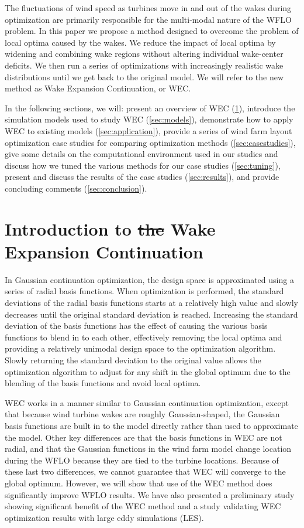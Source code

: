 \documentclass[hidelinks,sort&compress,AMA,STIX1COL]{WileyNJD-v2}
\providecommand{\DIFdel}[1]{{\protect\color{red}\sout{#1}}}                      %
\providecommand{\DIFdelbegin}{} %
\providecommand{\DIFdelend}{} %
\newcommand{\DIFscaledelfig}{0.5}
\newlength{\DIFdelgraphicswidth} %
\newlength{\DIFdelgraphicsheight} %
\newcommand{\DIFdelincludegraphics}[2][]{%
\sbox{\DIFdelgraphicsbox}{\DIFOincludegraphics[#1]{#2}}%
\settoboxwidth{\DIFdelgraphicswidth}{\DIFdelgraphicsbox} %
\settoboxtotalheight{\DIFdelgraphicsheight}{\DIFdelgraphicsbox} %
\scalebox{\DIFscaledelfig}{%
\parbox[b]{\DIFdelgraphicswidth}{\usebox{\DIFdelgraphicsbox}\\[-\baselineskip] \rule{\DIFdelgraphicswidth}{0em}}\llap{\resizebox{\DIFdelgraphicswidth}{\DIFdelgraphicsheight}{%
\setlength{\unitlength}{\DIFdelgraphicswidth}%
\begin{picture}(1,1)%
\thicklines\linethickness{2pt} %
{\color[rgb]{1,0,0}\put(0,0){\framebox(1,1){}}}%
{\color[rgb]{1,0,0}\put(0,0){\line( 1,1){1}}}%
{\color[rgb]{1,0,0}\put(0,1){\line(1,-1){1}}}%
\end{picture}%
}\hspace*{3pt}}} %
} %
\DeclareRobustCommand{\DIFdelbegin}{\DIFOdelbegin \let\includegraphics\DIFdelincludegraphics} %
\DeclareRobustCommand{\DIFdelend}{\DIFOaddend \let\includegraphics\DIFOincludegraphics} %
\begin{document}
The fluctuations of wind speed as turbines move in and out of the wakes during optimization are primarily responsible for the multi-modal nature of the WFLO problem. In this paper we propose a method designed to overcome the problem of local optima caused by the wakes. We reduce the impact of local optima by widening and combining wake regions without altering individual wake-center deficits. We then run a series of optimizations with increasingly realistic wake distributions until we get back to the original model. We will refer to the new method as Wake Expansion Continuation, or WEC. 

In the following sections, we will: present an overview of WEC (\cref{sec:introwec}), introduce the simulation models used to study WEC (\cref{sec:models}), demonstrate how to apply WEC to existing models (\cref{sec:application}), provide a series of wind farm layout optimization case studies for comparing optimization methods (\cref{sec:casestudies}), give some details on the computational environment used in our studies and discuss how we tuned the various methods for our case studies (\cref{sec:tuning}), present and discuss the results of the case studies (\cref{sec:results}), and provide concluding comments (\cref{sec:conclusion}).

\section{Introduction to \DIFdelbegin \DIFdel{the }\DIFdelend Wake Expansion Continuation}\label{sec:introwec}

In Gaussian continuation optimization, the design space is approximated using a series of radial basis functions\cite{mobahi2015}. When optimization is performed, the standard deviations of the radial basis functions starts at a relatively high value and slowly decreases until the original standard deviation is reached. Increasing the standard deviation of the basis functions has the effect of causing the various basis functions to blend in to each other, effectively removing the local optima and providing a relatively unimodal design space to the optimization algorithm. Slowly returning the standard deviation to the original value allows the optimization algorithm to adjust for any shift in the global optimum due to the blending of the basis functions and avoid local optima. 

WEC works in a manner similar to Gaussian continuation optimization, except that because wind turbine wakes are roughly Gaussian-shaped, the Gaussian basis functions are built in to the model directly rather than used to approximate the model. Other key differences are that the basis functions in WEC are not radial, and that the Gaussian functions in the wind farm model change location during the WFLO because they are tied to the turbine locations. Because of these last two differences, we cannot guarantee that WEC will converge to the global optimum. However, we will show that use of the WEC method does significantly improve WFLO results. We have also presented a preliminary study showing significant benefit of the WEC method\cite{thomas2018-wec} and a study validating WEC optimization results with large eddy simulations (LES)\cite{thomas2019-les-validation}.
\end{document}
